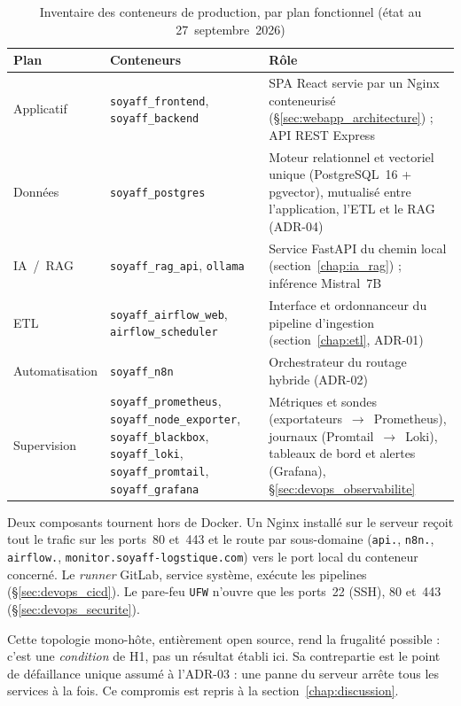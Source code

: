 \begin{table}[htbp]
\centering
\footnotesize
\caption{Inventaire des conteneurs de production, par plan fonctionnel (état au 27~septembre~2026)}
\label{tab:inventaire_conteneurs}
\begin{tabularx}{\linewidth}{|l|>{\raggedright\arraybackslash}p{5.5cm}|>{\raggedright\arraybackslash}X|}
\hline
\rowcolor[HTML]{EFEFEF}
\textbf{Plan} & \textbf{Conteneurs} & \textbf{Rôle} \\ \hline
Applicatif & \texttt{soyaff\_frontend}, \texttt{soyaff\_backend} & SPA React servie par un Nginx conteneurisé (\S\ref{sec:webapp_architecture}) ; API REST Express \\ \hline
Données & \texttt{soyaff\_postgres} & Moteur relationnel et vectoriel unique (PostgreSQL~16 + pgvector), mutualisé entre l'application, l'ETL et le RAG (ADR-04) \\ \hline
IA~/~RAG & \texttt{soyaff\_rag\_api}, \texttt{ollama} & Service FastAPI du chemin local (section~\ref{chap:ia_rag}) ; inférence Mistral~7B \\ \hline
ETL & \texttt{soyaff\_airflow\_web}, \texttt{airflow\_scheduler} & Interface et ordonnanceur du pipeline d'ingestion (section~\ref{chap:etl}, ADR-01) \\ \hline
Automatisation & \texttt{soyaff\_n8n} & Orchestrateur du routage hybride (ADR-02) \\ \hline
Supervision & \texttt{soyaff\_prometheus}, \texttt{soyaff\_node\_exporter}, \texttt{soyaff\_blackbox}, \texttt{soyaff\_loki}, \texttt{soyaff\_promtail}, \texttt{soyaff\_grafana} & Métriques et sondes (exportateurs~$\rightarrow$~Prometheus), journaux (Promtail~$\rightarrow$~Loki), tableaux de bord et alertes (Grafana), \S\ref{sec:devops_observabilite} \\ \hline
\end{tabularx}
\end{table}

Deux composants tournent hors de Docker. Un Nginx installé sur le serveur reçoit tout le trafic sur les ports~80 et~443 et le route par sous-domaine (\texttt{api.}, \texttt{n8n.}, \texttt{airflow.}, \texttt{monitor.soyaff-logstique.com}) vers le port local du conteneur concerné. Le \textit{runner} GitLab, service système, exécute les pipelines (\S\ref{sec:devops_cicd}). Le pare-feu \texttt{UFW} n'ouvre que les ports~22 (SSH), 80 et~443 (\S\ref{sec:devops_securite}).

Cette topologie mono-hôte, entièrement open source, rend la frugalité possible : c'est une \emph{condition} de H1, pas un résultat établi ici. Sa contrepartie est le point de défaillance unique assumé à l'ADR-03 : une panne du serveur arrête tous les services à la fois. Ce compromis est repris à la section~\ref{chap:discussion}.

